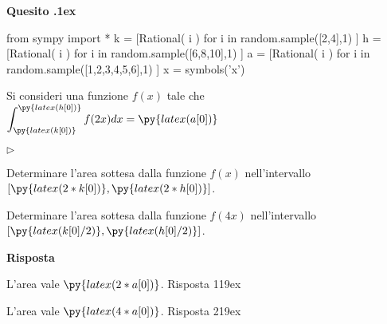 \documentclass[11pt,twoside,a4paper]{article}
\newcommand{\mylabel}[1]{#1\hfill}
\renewenvironment{itemize}
  {\begin{list}{$\triangleright$}{%
   \setlength{\parskip}{0mm}
   \setlength{\topsep}{.4\baselineskip}
   \setlength{\rightmargin}{0mm}
   \setlength{\listparindent}{0mm}
   \setlength{\itemindent}{0mm}
   \setlength{\labelwidth}{2ex}
   \setlength{\itemsep}{.4\baselineskip}
   \setlength{\parsep}{0mm}
   \setlength{\partopsep}{0mm}
   \setlength{\labelsep}{1ex}
   \setlength{\leftmargin}{\labelwidth+\labelsep}
   \let\makelabel\mylabel}}{%
   \end{list}\vspace*{-1.3mm}}
\newcounter{quesito}
\newenvironment{question}{\bigskip\addtocounter{quesito}{1}\bigskip\bigskip\par\textbf{Quesito \thequesito.\kern1ex}}{\vspace{\parskip}}
\newenvironment{answer}{\par\textbf{Risposta\quad}}{\vspace{\parskip}}
\begin{document}
\begin{question}
\begin{pycode}
from sympy import *
k = [Rational( i ) for i in random.sample([2,4],1) ]
h = [Rational( i ) for i in random.sample([6,8,10],1) ]
a = [Rational( i ) for i in random.sample([1,2,3,4,5,6],1) ]
x = symbols('x')
\end{pycode}
Si consideri una funzione $f(x)$ tale che $\displaystyle \int_{\py{latex(k[0])}}^{\py{latex(h[0])}} f(2x) dx = \py{latex(a[0])}$
\begin{itemize}
\item[1.] Determinare l'area sottesa dalla funzione $f(x)$ nell'intervallo $[\py{latex(2*k[0])},\py{latex(2*h[0])}]$.
\item[2.] Determinare l'area sottesa dalla funzione $f(4x)$ nell'intervallo $[\py{latex(k[0]/2)},\py{latex(h[0]/2)}]$.
\end{itemize}
\begin{answer}

{\color{blue} L'area vale $\py{latex(2*a[0])}$. 
\hfill Risposta 1\kern19ex}

\smallskip
{\color{blue}L'area vale $\py{latex(4*a[0])}$.
\hfill Risposta 2\kern19ex}

\end{answer}
\end{question}
\end{document}

